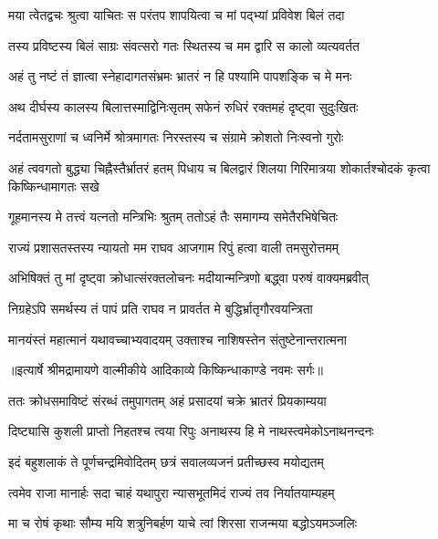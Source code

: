 \twolineshloka
{मया त्वेतद्वचः श्रुत्वा याचितः स परंतप}
{शापयित्वा च मां पद्भ्यां प्रविवेश बिलं तदा} %

\twolineshloka
{तस्य प्रविष्टस्य बिलं साग्रः संवत्सरो गतः}
{स्थितस्य च मम द्वारि स कालो व्यत्यवर्तत} %

\twolineshloka
{अहं तु नष्टं तं ज्ञात्वा स्नेहादागतसंभ्रमः}
{भ्रातरं न हि पश्यामि पापशङ्कि च मे मनः} %

\twolineshloka
{अथ दीर्घस्य कालस्य बिलात्तस्माद्विनिःसृतम्}
{सफेनं रुधिरं रक्तमहं दृष्ट्वा सुदुःखितः} %

\twolineshloka
{नर्दतामसुराणां च ध्वनिर्मे श्रोत्रमागतः}
{निरस्तस्य च संग्रामे क्रोशतो निःस्वनो गुरोः} %

\threelineshloka
{अहं त्ववगतो बुद्ध्या चिह्नैस्तैर्भ्रातरं हतम्}
{पिधाय च बिलद्वारं शिलया गिरिमात्रया}
{शोकार्तश्चोदकं कृत्वा किष्किन्धामागतः सखे} %

\twolineshloka
{गूहमानस्य मे तत्त्वं यत्नतो मन्त्रिभिः श्रुतम्}
{ततोऽहं तैः समागम्य समेतैरभिषेचितः} %

\twolineshloka
{राज्यं प्रशासतस्तस्य न्यायतो मम राघव}
{आजगाम रिपुं हत्वा वाली तमसुरोत्तमम्} %

\twolineshloka
{अभिषिक्तं तु मां दृष्ट्वा क्रोधात्संरक्तलोचनः}
{मदीयान्मन्त्रिणो बद्ध्वा परुषं वाक्यमब्रवीत्} %

\twolineshloka
{निग्रहेऽपि समर्थस्य तं पापं प्रति राघव}
{न प्रावर्तत मे बुद्धिर्भ्रातृगौरवयन्त्रिता} %

\twolineshloka
{मानयंस्तं महात्मानं यथावच्चाभ्यवादयम्}
{उक्ताश्च नाशिषस्तेन संतुष्टेनान्तरात्मना} %


{॥इत्यार्षे श्रीमद्रामायणे वाल्मीकीये आदिकाव्ये किष्किन्धाकाण्डे नवमः सर्गः॥}


\twolineshloka
{ततः क्रोधसमाविष्टं संरब्धं तमुपागतम्}
{अहं प्रसादयां चक्रे भ्रातरं प्रियकाम्यया} %

\twolineshloka
{दिष्ट्यासि कुशली प्राप्तो निहतश्च त्वया रिपुः}
{अनाथस्य हि मे नाथस्त्वमेकोऽनाथनन्दनः} %

\twolineshloka
{इदं बहुशलाकं ते पूर्णचन्द्रमिवोदितम्}
{छत्रं सवालव्यजनं प्रतीच्छस्व मयोद्यतम्} %

\twolineshloka
{त्वमेव राजा मानार्हः सदा चाहं यथापुरा}
{न्यासभूतमिदं राज्यं तव निर्यातयाम्यहम्} %

\twolineshloka
{मा च रोषं कृथाः सौम्य मयि शत्रुनिबर्हण}
{याचे त्वां शिरसा राजन्मया बद्धोऽयमञ्जलिः} %

